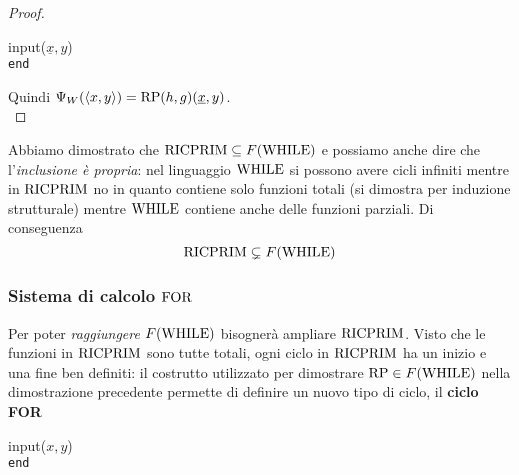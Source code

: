 \begin{proof}
	\begin{center}
		\begin{minipage}{0.85\textwidth}
			\begin{tcolorbox}[colback=white,sharp corners,boxrule=.3mm]
				\begin{algorithm}[H]
					\SetAlgoNoEnd
					input($\underline{x},y$) \\
					\texttt{end}
				\end{algorithm}
			\end{tcolorbox}
		\end{minipage}
	\end{center}
	
	Quindi $\Psi_W (\langle x,y \rangle) = \text{RP} (h,g) (\underline{x}, y)$.\\
\end{proof}

Abbiamo dimostrato che $\text{RICPRIM} \subseteq F(\text{WHILE})$ e possiamo anche dire che l'\textit{inclusione è propria}: nel linguaggio $\text{WHILE}$ si possono avere cicli infiniti mentre in $\text{RICPRIM}$ no in quanto contiene solo funzioni totali (si dimostra per induzione strutturale) mentre $\text{WHILE}$ contiene anche delle funzioni parziali. Di conseguenza
$$ \text{RICPRIM} \subsetneq F(\text{WHILE}) $$

\subsubsection{Sistema di calcolo $\text{FOR}$}

Per poter \textit{raggiungere} $F(\text{WHILE})$ bisognerà ampliare $\text{RICPRIM}$. Visto che le funzioni in $\text{RICPRIM}$ sono tutte totali, ogni ciclo in $\text{RICPRIM}$ ha un inizio e una fine ben definiti: il costrutto utilizzato per dimostrare $\text{RP} \in F(\text{WHILE})$ nella dimostrazione precedente permette di definire un nuovo tipo di ciclo, il \textbf{ciclo FOR}
\begin{center}
	\begin{minipage}{.85\textwidth}
		\begin{tcolorbox}[colback=white,sharp corners,boxrule=.3mm]
			\begin{algorithm}[H]
				\SetAlgoNoEnd
				input($x,y$) \\
				\texttt{end}
			\end{algorithm}
		\end{tcolorbox} 
	\end{minipage}
\end{center}

